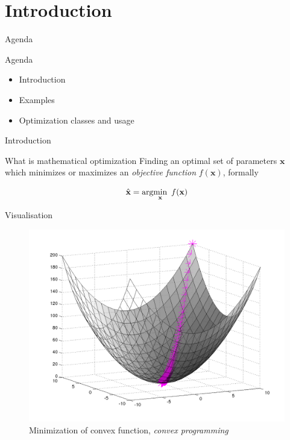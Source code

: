 \documentclass[11pt,a4paper]{beamer}
\begin{document}
\section{Introduction}
\begin{frame}{Agenda}
\begin{block}{Agenda}
\begin{itemize}
\item Introduction \pause
\item Examples \pause
\item Optimization classes and usage
\end{itemize}
\end{block}
\end{frame}


\begin{frame}{Introduction}
\begin{block}{What is mathematical optimization}
Finding an optimal set of parameters $\textbf{x}$ which minimizes or maximizes an \textit{objective function} $f(\textbf{x})$, formally

\[ \hat{\textbf{x}} = \textnormal{arg} \underset{\textbf{x}}{\textnormal{min}} \hspace{5px} f(\textbf{x}) \]
\end{block}
\end{frame}
\begin{frame}{Visualisation}
\begin{figure}
\centering
\includegraphics[width=0.7\linewidth]{images/gradientdescent}
\caption{Minimization of convex function, \textit{convex programming}}

\label{fig:gradientdescent}
\end{figure}
\end{frame}
\end{document}
